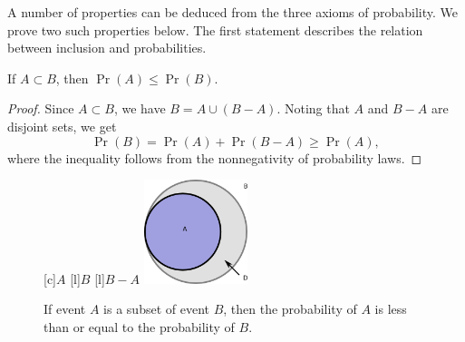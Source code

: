 A number of properties can be deduced from the three axioms of probability.
We prove two such properties below.
The first statement describes the relation between inclusion and probabilities.
\begin{proposition}
If $A \subset B$, then $\Pr (A) \leq \Pr (B)$.
\end{proposition}
\begin{proof}
Since $A \subset B$, we have $B = A \cup (B - A)$.
Noting that $A$ and $B - A$ are disjoint sets, we get
\begin{equation*}
\Pr (B) = \Pr (A) + \Pr (B - A) \geq \Pr (A) ,
\end{equation*}
where the inequality follows from the nonnegativity of probability laws.
\end{proof}
\begin{figure}[htb!]
\begin{center}
\begin{psfrags}
[c]{$A$}
[l]{$B$}
[l]{$B - A$}
\includegraphics[height=3.03cm]{Figures/2Chapter/subset}
\end{psfrags}
\caption{If event $A$ is a subset of event $B$, then the probability of $A$ is less than or equal to the probability of $B$.}
\end{center}
\end{figure}

